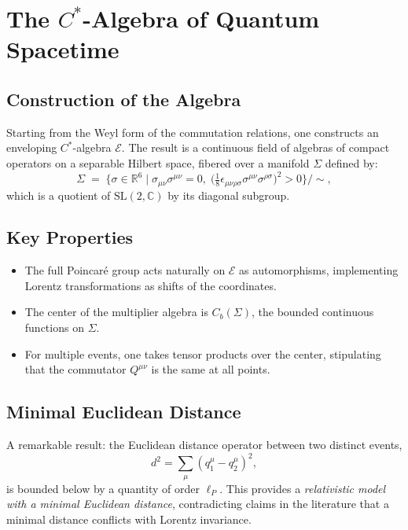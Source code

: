 \documentclass[11pt,a4paper]{article}
\begin{document}
\section{The $C^*$-Algebra of Quantum Spacetime}

\subsection{Construction of the Algebra}

Starting from the Weyl form of the commutation relations, one constructs
an enveloping $C^*$-algebra $\mathcal{E}$. The result is a continuous
field of algebras of compact operators on a separable Hilbert space,
fibered over a manifold $\Sigma$ defined by:
\begin{equation}
  \Sigma \;=\; \bigl\{\sigma \in \mathbb{R}^6 \;\big|\;
  \sigma_{\mu\nu}\sigma^{\mu\nu} = 0,\;
  \bigl(\tfrac{1}{8}\epsilon_{\mu\nu\rho\sigma}\sigma^{\mu\nu}\sigma^{\rho\sigma}\bigr)^2
  > 0 \bigr\} \Big/ \sim,
\end{equation}
which is a quotient of $\mathrm{SL}(2,\mathbb{C})$ by its diagonal subgroup.

\subsection{Key Properties}

\begin{itemize}[nosep]
  \item The full Poincar\'e group acts naturally on $\mathcal{E}$ as
        automorphisms, implementing Lorentz transformations as shifts
        of the coordinates.
  \item The center of the multiplier algebra is $C_b(\Sigma)$, the bounded
        continuous functions on $\Sigma$.
  \item For multiple events, one takes tensor products over the center,
        stipulating that the commutator $Q^{\mu\nu}$ is the same at
        all points.
\end{itemize}

\subsection{Minimal Euclidean Distance}

A remarkable result: the Euclidean distance operator between two
distinct events,
\begin{equation}
  d^2 = \sum_\mu (q_1^\mu - q_2^\mu)^2,
\end{equation}
is bounded below by a quantity of order $\ell_P$. This provides a
\emph{relativistic model with a minimal Euclidean distance}, contradicting
claims in the literature that a minimal distance conflicts with
Lorentz invariance.
\end{document}
